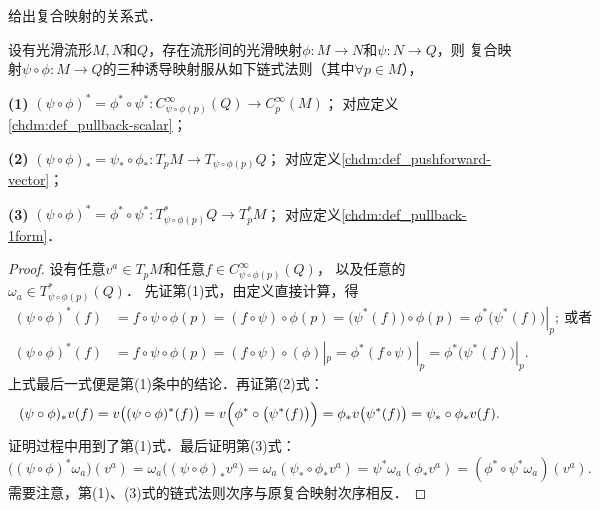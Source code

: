 给出复合映射的关系式．
\begin{theorem}\label{chdm:thm_map-chain-rule}
    设有光滑流形$M,N$和$Q$，存在流形间的光滑映射$\phi:M\to N$和$\psi:N\to Q$，则
    复合映射$ \psi\circ\phi  : M\to Q$的三种诱导映射服从如下链式法则（其中$\forall p\in M$），
    
    {\bfseries (1)} $(\psi\circ \phi)^{*}= \phi^{*}\circ \psi^{*}:  C^{\infty}_{\psi\circ\phi(p)}(Q)\to C^{\infty}_p (M)$；
    对应定义\ref{chdm:def_pullback-scalar}；
    
    {\bfseries (2)} $(\psi\circ \phi)_{*}= \psi_{*}\circ \phi_{*}: T_p M\to T_{\psi\circ\phi(p)}Q$；
    对应定义\ref{chdm:def_pushforward-vector}；
    
    {\bfseries (3)} $(\psi\circ \phi)^{*}= \phi^{*}\circ \psi^{*}:  T^{*}_{\psi\circ\phi(p)}Q\to T^{*}_p M$；
    对应定义\ref{chdm:def_pullback-1form}．
\end{theorem}
\begin{proof}
    设有任意$v^a\in T_pM$和任意$f\in C^\infty_{\psi\circ\phi(p)}(Q)$，
    以及任意的$\omega_a\in T^{*}_{\psi\circ\phi(p)}(Q)$．
    先证第(1)式，由定义直接计算，得
    \begin{align*}
        (\psi\circ \phi)^{*} (f) &= f\circ \psi\circ \phi (p) = (f\circ \psi )\circ \phi (p)
        =\bigl(\psi^*(f) \bigr)\circ \phi (p) = \left. \phi^*\bigl(\psi^*(f) \bigr) \right|_p;
        \ \text{或者} \\
        (\psi\circ \phi)^{*} (f) &= f\circ \psi\circ \phi (p) = (f\circ \psi )\circ (\phi)|_p
        =\phi^* (f\circ \psi )|_p = \left. \phi^*\bigl(\psi^*(f) \bigr) \right|_p .
    \end{align*}
    上式最后一式便是第(1)条中的结论．再证第(2)式：
    \begin{equation*}
        (\psi\circ \phi)_{*}v (f) = v \bigl((\psi\circ \phi)^{*} (f)\bigr)
          =v \Bigl(\phi^{*}\circ \bigl( \psi^{*} (f)\bigr) \Bigr)
          =\phi_{*} v \bigl( \psi^{*} (f)\bigr) =\psi_{*} \circ \phi_{*} v (f) .
    \end{equation*}
    证明过程中用到了第(1)式．最后证明第(3)式：
    \begin{equation*}
        \bigl((\psi\circ \phi)^{*} \omega_a\bigr) (v^a) = \omega_a \bigl((\psi\circ \phi)_{*} v^a\bigr)
        = \omega_a (\psi_{*} \circ \phi_{*}  v^a )
        = \psi^{*} \omega_a ( \phi_{*}  v^a)
        = (\phi^{*}\circ \psi^{*} \omega_a) (v^a) .
    \end{equation*}
    需要注意，第(1)、(3)式的链式法则次序与原复合映射次序相反．
\end{proof}

